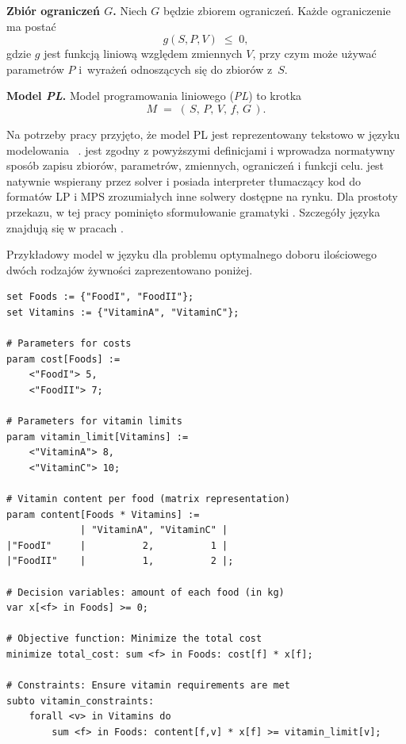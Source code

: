 \textbf{Zbiór ograniczeń \boldmath$G$.}
Niech $G$ będzie zbiorem ograniczeń. Każde ograniczenie ma postać
\[
g(S,P,V) \;\leq\; 0,
\]
gdzie $g$ jest funkcją liniową względem zmiennych $V$, przy czym może używać parametrów $P$ i~wyrażeń odnoszących się do zbiorów z~$S$.

\textbf{Model \textit{PL}.}
Model programowania liniowego (\textit{PL}) to krotka
\[
M \;=\; (\,S,\,P,\,V,\,f,\,G\,).
\]

Na potrzeby pracy przyjęto, że model PL jest reprezentowany tekstowo w języku modelowania ~\cite{zimpl_manual}.  jest zgodny z powyższymi definicjami i wprowadza normatywny sposób zapisu zbiorów, parametrów, zmiennych, ograniczeń i funkcji celu.  jest natywnie wspierany przez solver  \cite{scip2023} i posiada interpreter tłumaczący kod  do formatów LP i MPS zrozumiałych inne solwery dostępne na rynku. Dla prostoty przekazu, w tej pracy pominięto sformułowanie gramatyki . Szczegóły języka  znajdują się w pracach \cite{zimpl_manual,Koch2005}.

Przykładowy model  w języku  dla problemu optymalnego doboru ilościowego dwóch rodzajów żywności zaprezentowano poniżej.
\begin{lstlisting}[language=zimpl]
set Foods := {"FoodI", "FoodII"};
set Vitamins := {"VitaminA", "VitaminC"};

# Parameters for costs
param cost[Foods] := 
    <"FoodI"> 5, 
    <"FoodII"> 7;

# Parameters for vitamin limits
param vitamin_limit[Vitamins] := 
    <"VitaminA"> 8, 
    <"VitaminC"> 10;

# Vitamin content per food (matrix representation)
param content[Foods * Vitamins] :=
             | "VitaminA", "VitaminC" |
|"FoodI"     |          2,          1 |
|"FoodII"    |          1,          2 |;

# Decision variables: amount of each food (in kg)
var x[<f> in Foods] >= 0;

# Objective function: Minimize the total cost
minimize total_cost: sum <f> in Foods: cost[f] * x[f];

# Constraints: Ensure vitamin requirements are met
subto vitamin_constraints: 
    forall <v> in Vitamins do
        sum <f> in Foods: content[f,v] * x[f] >= vitamin_limit[v];

\end{lstlisting}

